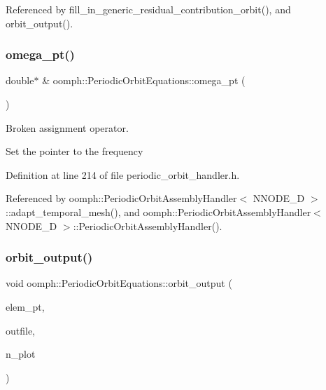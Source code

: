 Referenced by fill\+\_\+in\+\_\+generic\+\_\+residual\+\_\+contribution\+\_\+orbit(), and orbit\+\_\+output().

\mbox{\label{classoomph_1_1PeriodicOrbitEquations_a3c9cba05d2827927a61e5e0d742b94a7}} 
\subsubsection{\texorpdfstring{omega\+\_\+pt()}{omega\_pt()}}
{\footnotesize\ttfamily double$\ast$ \& oomph\+::\+Periodic\+Orbit\+Equations\+::omega\+\_\+pt (\begin{DoxyParamCaption}{ }\end{DoxyParamCaption})\hspace{0.3cm}{\ttfamily [inline]}}



Broken assignment operator. 

Set the pointer to the frequency 

Definition at line 214 of file periodic\+\_\+orbit\+\_\+handler.\+h.



Referenced by oomph\+::\+Periodic\+Orbit\+Assembly\+Handler$<$ N\+N\+O\+D\+E\+\_\+D $>$\+::adapt\+\_\+temporal\+\_\+mesh(), and oomph\+::\+Periodic\+Orbit\+Assembly\+Handler$<$ N\+N\+O\+D\+E\+\_\+D $>$\+::\+Periodic\+Orbit\+Assembly\+Handler().

\mbox{\label{classoomph_1_1PeriodicOrbitEquations_a117883e07ed35569cd396deb2c5bba97}} 
\subsubsection{\texorpdfstring{orbit\+\_\+output()}{orbit\_output()}}
{\footnotesize\ttfamily void oomph\+::\+Periodic\+Orbit\+Equations\+::orbit\+\_\+output (\begin{DoxyParamCaption}\item[{\hyperlink{classoomph_1_1GeneralisedElement}{Generalised\+Element} $\ast$const \&}]{elem\+\_\+pt,  }\item[{std\+::ostream \&}]{outfile,  }\item[{const unsigned \&}]{n\+\_\+plot }\end{DoxyParamCaption})}



